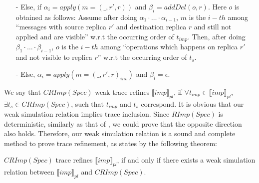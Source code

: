 {\begin{itemize}
\item[-] Else, if $\alpha_i = apply(m=(\_,r',r))$ and $\beta_i = addDel(o,r)$. Here $o$ is obtained as follows: Assume after doing $\alpha_1 \cdot \ldots \cdot \alpha_{i-1}$, $m$ is the $i-th$ among ``messages with source replica $r'$ and destination replica $r$ and still not applied and are visible'' w.r.t the occurring order of $t_{imp}$. Then, after doing $\beta_1 \cdot \ldots \cdot \beta_{i-1}$, $o$ is the $i-th$ among ``operations which happens on replica $r'$ and not visible to replica $r$'' w.r.t the occurring order of $t_s$.

\item[-] Else, $\alpha_i = apply(m=(\_,r',r)_{inv})$ and $\beta_i = \epsilon$.
\end{itemize}

We say that $CRImp(Spec)$ weak trace refines $\llbracket imp \rrbracket_{pl}$, if $\forall t_{imp} \in \llbracket imp \rrbracket_{pl}$, $\exists t_s \in CRImp(Spec)$, such that $t_{imp}$ and $t_s$ correspond. It is obvious that our weak simulation relation implies trace inclusion. Since $RImp(Spec)$ is deterministic, similarly as that of \cite{Abadi:1991,Lynch:1995}, we could prove that the opposite direction also holds. Therefore, our weak simulation relation is a sound and complete method to prove trace refinement, as states by the following theorem:

\begin{theorem}
\label{theorem:equivalence of our simulation relation and sequence inclusion for add-plus specification and its compacted reference implementation}
$CRImp(Spec)$ trace refines $\llbracket imp \rrbracket_{pl}$, if and only if there exists a weak simulation relation between $\llbracket imp \rrbracket_{pl}$ and $CRImp(Spec)$.
\end{theorem}
}


